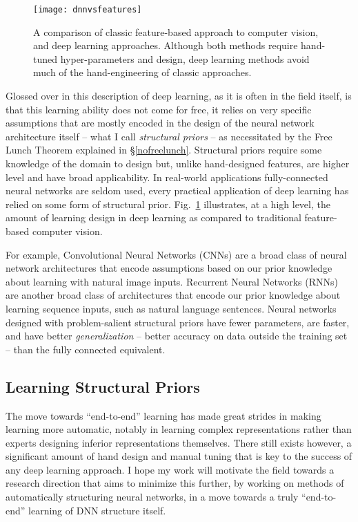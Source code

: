 \documentclass[thesis]{subfiles}
\begin{document}
\begin{figure}[tbp]
	\centering
	\texttt{[image: dnnvsfeatures]}
	\caption{A comparison of classic feature-based approach to computer vision, and deep learning approaches. Although both methods require hand-tuned hyper-parameters and design, deep learning methods avoid much of the hand-engineering of classic approaches.}
	\label{dnnvsfeatures}
\end{figure}
	
Glossed over in this description of deep learning, as it is often in the field itself, is that this learning ability does not come for free, it relies on very specific assumptions that are mostly encoded in the design of the neural network architecture itself -- what I call \emph{structural priors} -- as necessitated by the Free Lunch Theorem explained in \S\ref{nofreelunch}. Structural priors require some knowledge of the domain to design but, unlike hand-designed features, are higher level and have broad applicability. In real-world applications fully-connected neural networks are seldom used, every practical application of deep learning has relied on some form of structural prior. Fig.~\ref{dnnvsfeatures} illustrates, at a high level, the amount of learning \vs design in deep learning as compared to traditional feature-based computer vision.

For example, Convolutional Neural Networks (CNNs) are a broad class of neural network architectures that encode assumptions based on our prior knowledge about learning with natural image inputs. Recurrent Neural Networks (RNNs) are another broad class of architectures that encode our prior knowledge about learning sequence inputs, such as natural language sentences. Neural networks designed with problem-salient structural priors have fewer parameters, are faster, and have better \emph{generalization} -- better accuracy on data outside the training set -- than the fully connected equivalent.

\subsection{Learning Structural Priors}
The move towards ``end-to-end'' learning has made great strides in making learning more automatic, notably in learning complex representations rather than experts designing inferior representations themselves. There still exists however, a significant amount of hand design and manual tuning that is key to the success of any deep learning approach. I hope my work will motivate the field towards a research direction that aims to minimize this further, by working on methods of automatically structuring neural networks, in a move towards a truly ``end-to-end'' learning of DNN structure itself.
\end{document}
